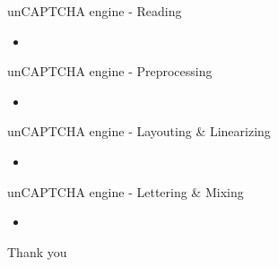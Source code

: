 \documentclass[red]{beamer}
\begin{document}
\begin{frame}{unCAPTCHA engine - Reading}
  \begin{itemize}
	\item
  \end{itemize}
\end{frame}

\begin{frame}{unCAPTCHA engine - Preprocessing}
  \begin{itemize}
	\item
  \end{itemize}
\end{frame}

\begin{frame}{unCAPTCHA engine - Layouting \& Linearizing}
  \begin{itemize}
	\item
  \end{itemize}
\end{frame}

\begin{frame}{unCAPTCHA engine - Lettering \& Mixing}
  \begin{itemize}
	\item
  \end{itemize}
\end{frame}

\begin{frame}{Thank you}
  \begin{center}
  \end{center}
\end{frame}
\end{document}
